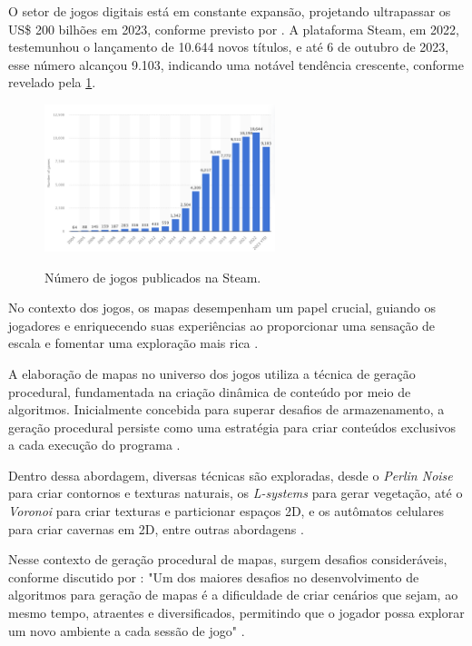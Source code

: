 
O setor de jogos digitais está em constante expansão, projetando ultrapassar os US\$ 200 bilhões em 2023, conforme previsto por . A plataforma Steam, em 2022, testemunhou o lançamento de 10.644 novos títulos, e até 6 de outubro de 2023, esse número alcançou 9.103, indicando uma notável tendência crescente, conforme revelado pela \cref{fig:steam_publishes}.

\begin{figure}[!ht]
\centering
\caption{Número de jogos publicados na Steam.}
\includegraphics[width=0.6\textwidth]{figures/steam_sales.png}
\label{fig:steam_publishes}
\end{figure}

No contexto dos jogos, os mapas desempenham um papel crucial, guiando os jogadores e enriquecendo suas experiências ao proporcionar uma sensação de escala e fomentar uma exploração mais rica \cite{video_game_maps, minimap}.

A elaboração de mapas no universo dos jogos utiliza a técnica de geração procedural, fundamentada na criação dinâmica de conteúdo por meio de algoritmos. Inicialmente concebida para superar desafios de armazenamento, a geração procedural persiste como uma estratégia para criar conteúdos exclusivos a cada execução do programa \cite{kenny2021procedural, lambda3}.

Dentro dessa abordagem, diversas técnicas são exploradas, desde o \textit{Perlin Noise} para criar contornos e texturas naturais, os \textit{L-systems} para gerar vegetação, até o \textit{Voronoi} para criar texturas e particionar espaços 2D, e os autômatos celulares para criar cavernas em 2D, entre outras abordagens \cite{kvrivzmulti}.

Nesse contexto de geração procedural de mapas, surgem desafios consideráveis, conforme discutido por : "Um dos maiores desafios no desenvolvimento de algoritmos para geração de mapas é a dificuldade de criar cenários que sejam, ao mesmo tempo, atraentes e diversificados, permitindo que o jogador possa explorar um novo ambiente a cada sessão de jogo" \cite{geracao_procedural_jogos_2d}.

